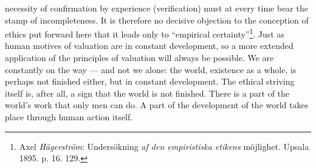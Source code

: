 \documentclass[12pt,a4paper,openany]{book}
\begin{document}
necessity of confirmation by experience (verification) must at every time bear the stamp of incompleteness.
It is therefore no decisive objection to the conception of ethics put forward here that it leads only to
``empirical certainty''\footnote[1]{Axel \emph{Hägerström}: Undersökning \textit{af den empiristiska
etikens} möjlighet. Upsala 1895. p. 16. 129.}. Just as human motives of valuation are in constant
development, so a more extended application of the principles of valuation will always be possible. We are
constantly on the way --- and not we alone: the world, existence as a whole, is perhaps not finished either,
but in constant development. The ethical striving itself is, after all, a sign that the world is not
finished. There is a part of the world's work that only men can do. A part of the development of the world
takes place through human action itself.
\end{document}
